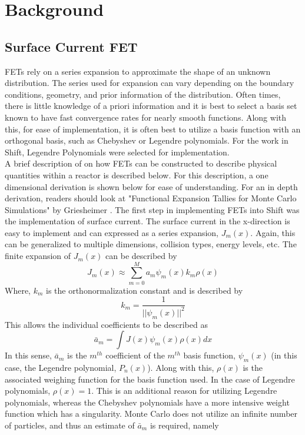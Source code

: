 \documentclass[10tma4paper]{article}
\begin{document}
\section{Background}\label{background}

\subsection{Surface Current FET}\label{Surface Current FET}

FETs rely on a series expansion to approximate the shape of an unknown distribution. The series used for expansion can vary depending on the boundary conditions, geometry, and prior information of the distribution. Often times, there is little knowledge of a priori information and it is best to select a basis set known to have fast convergence rates for nearly smooth functions. Along with this, for ease of implementation, it is often best to utilize a basis function with an orthogonal basis, such as Chebyshev or Legendre polynomials. For the work in Shift, Legendre Polynomials were selected for implementation.
\\
A brief description of on how FETs can be constructed to describe physical quantities within a reactor is described below. For this description, a one dimensional derivation is shown below for ease of understanding. For an in depth derivation, readers should look at "Functional Expansion Tallies for Monte Carlo Simulations" by Griesheimer \cite{FETThesis}. The first step in implementing FETs into Shift was the implementation of surface current. The surface current in the x-direction is easy to implement and can expressed as a series expansion, $J_{m}(x)$. Again, this can be generalized to multiple dimensions, collision types, energy levels, etc. The finite expansion of $J_{m}(x)$ can be described by
	\begin{equation} \label{eq:current approx}
	J_{m}(x) \approx \sum_{m=0}^{M}a_{m}\psi_{m}(x)k_{m}\rho(x)
	\end{equation}
Where, $k_{m}$ is the orthonormalization constant and is described by
\begin{equation}\label{eq:ortho const}
k_{m} = \frac{1}{||\psi_{m}(x)||^{2}}
\end{equation} 
This allows the individual coefficients to be described as
	 \begin{equation} \label{eq:a bar m}
	\bar{a}_{m}=\int J(x)\psi_{m}(x)\rho(x)dx
	 \end{equation}
In this sense, $\bar{a}_m$ is the $m^{th}$ coefficient of the $m^{th}$ basis function, $\psi_{m}(x)$ (in this case, the Legendre polynomial, $P_{n}(x)$). Along with this, $\rho(x)$ is the associated weighing function for the basis function used. In the case of Legendre polynomials, $\rho(x)=1$. This is an additional reason for utilizing Legendre polynomials, whereas the Chebyshev polynomials have a more intensive weight function which has a singularity. Monte Carlo does not utilize an infinite number of particles, and thus an estimate of $\bar{a}_{m}$ is required, namely
\end{document}
